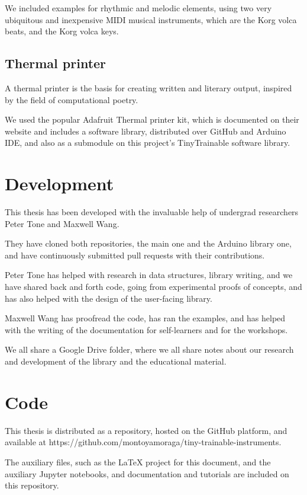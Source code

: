 We included examples for rhythmic and melodic elements, using two very ubiquitous and inexpensive MIDI musical instruments, which are the Korg volca beats, and the Korg volca keys.

\subsection{Thermal printer}

A thermal printer is the basis for creating written and literary output, inspired by the field of computational poetry.

We used the popular Adafruit Thermal printer kit, which is documented on their website and includes a software library, distributed over GitHub and Arduino IDE, and also as a submodule on this project's TinyTrainable software library.

\section{Development}

This thesis has been developed with the invaluable help of undergrad researchers Peter Tone and Maxwell Wang.

They have cloned both repositories, the main one and the Arduino library one, and have continuously submitted pull requests with their contributions.

Peter Tone has helped with research in data structures, library writing, and we have shared back and forth code, going from experimental proofs of concepts, and has also helped with the design of the user-facing library.

Maxwell Wang has proofread the code, has ran the examples, and has helped with the writing of the documentation for self-learners and for the workshops.

We all share a Google Drive folder, where we all share notes about our research and development of the library and the educational material.

\section{Code}

This thesis is distributed as a repository, hosted on the GitHub platform, and available at https://github.com/montoyamoraga/tiny-trainable-instruments.

The auxiliary files, such as the LaTeX project for this document, and the auxiliary Jupyter notebooks, and documentation and tutorials are included on this repository.

